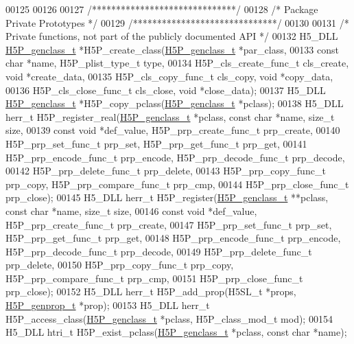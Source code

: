 \begin{DoxyCode}
00125 
00126 
00127 \textcolor{comment}{/******************************/}
00128 \textcolor{comment}{/* Package Private Prototypes */}
00129 \textcolor{comment}{/******************************/}
00130 
00131 \textcolor{comment}{/* Private functions, not part of the publicly documented API */}
00132 H5\_DLL \hyperlink{struct_h5_p__genclass__t}{H5P\_genclass\_t} *H5P\_create\_class(\hyperlink{struct_h5_p__genclass__t}{H5P\_genclass\_t} *par\_class,
00133     \textcolor{keyword}{const} \textcolor{keywordtype}{char} *name, H5P\_plist\_type\_t type,
00134     H5P\_cls\_create\_func\_t cls\_create, \textcolor{keywordtype}{void} *create\_data,
00135     H5P\_cls\_copy\_func\_t cls\_copy, \textcolor{keywordtype}{void} *copy\_data,
00136     H5P\_cls\_close\_func\_t cls\_close, \textcolor{keywordtype}{void} *close\_data);
00137 H5\_DLL \hyperlink{struct_h5_p__genclass__t}{H5P\_genclass\_t} *H5P\_copy\_pclass(\hyperlink{struct_h5_p__genclass__t}{H5P\_genclass\_t} *pclass);
00138 H5\_DLL herr\_t H5P\_register\_real(\hyperlink{struct_h5_p__genclass__t}{H5P\_genclass\_t} *pclass, \textcolor{keyword}{const} \textcolor{keywordtype}{char} *name, \textcolor{keywordtype}{size\_t} size,
00139     \textcolor{keyword}{const} \textcolor{keywordtype}{void} *def\_value, H5P\_prp\_create\_func\_t prp\_create,
00140     H5P\_prp\_set\_func\_t prp\_set, H5P\_prp\_get\_func\_t prp\_get,
00141     H5P\_prp\_encode\_func\_t prp\_encode, H5P\_prp\_decode\_func\_t prp\_decode,
00142     H5P\_prp\_delete\_func\_t prp\_delete,
00143     H5P\_prp\_copy\_func\_t prp\_copy, H5P\_prp\_compare\_func\_t prp\_cmp,
00144     H5P\_prp\_close\_func\_t prp\_close);
00145 H5\_DLL herr\_t H5P\_register(\hyperlink{struct_h5_p__genclass__t}{H5P\_genclass\_t} **pclass, \textcolor{keyword}{const} \textcolor{keywordtype}{char} *name, \textcolor{keywordtype}{size\_t} size,
00146     \textcolor{keyword}{const} \textcolor{keywordtype}{void} *def\_value, H5P\_prp\_create\_func\_t prp\_create,
00147     H5P\_prp\_set\_func\_t prp\_set, H5P\_prp\_get\_func\_t prp\_get,
00148     H5P\_prp\_encode\_func\_t prp\_encode, H5P\_prp\_decode\_func\_t prp\_decode,
00149     H5P\_prp\_delete\_func\_t prp\_delete,
00150     H5P\_prp\_copy\_func\_t prp\_copy, H5P\_prp\_compare\_func\_t prp\_cmp,
00151     H5P\_prp\_close\_func\_t prp\_close);
00152 H5\_DLL herr\_t H5P\_add\_prop(H5SL\_t *props, \hyperlink{struct_h5_p__genprop__t}{H5P\_genprop\_t} *prop);
00153 H5\_DLL herr\_t H5P\_access\_class(\hyperlink{struct_h5_p__genclass__t}{H5P\_genclass\_t} *pclass, H5P\_class\_mod\_t mod);
00154 H5\_DLL htri\_t H5P\_exist\_pclass(\hyperlink{struct_h5_p__genclass__t}{H5P\_genclass\_t} *pclass, \textcolor{keyword}{const} \textcolor{keywordtype}{char} *name);

\end{DoxyCode}
